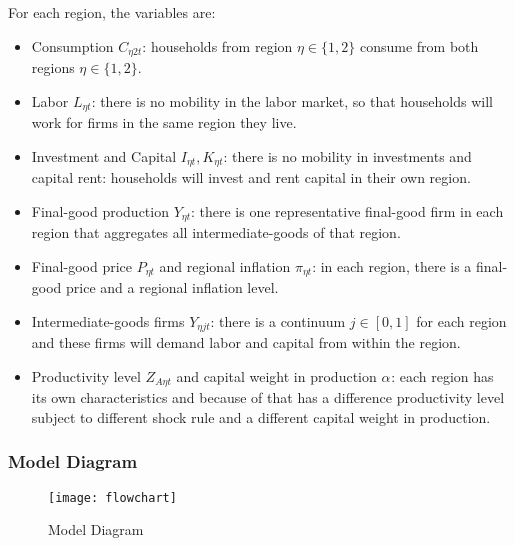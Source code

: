\documentclass[../thesis.tex]{subfiles}
\begin{document}
	For each region, the variables are:

\begin{itemize}
	\item Consumption \(C_{\eta 2 t}\): households from region $\eta \in \{1,2\}$ consume from both regions $\eta \in \{1,2\}$.
	
	\item Labor \(L_{\eta t}\): there is no mobility in the labor market, so that households will work for firms in the same region they live.
	
	\item Investment and Capital \(I_{\eta t}, K_{\eta t}\): there is no mobility in investments and capital rent: households will invest and rent capital in their own region.
	
	\item Final-good production \(Y_{\eta t}\): there is one representative final-good firm in each region that aggregates all intermediate-goods of that region.
	
	\item Final-good price \(P_{\eta t}\) and regional inflation \(\pi_{\eta t}\): in each region, there is a final-good price and a regional inflation level.
	
	\item Intermediate-goods firms \(Y_{\eta jt}\): there is a continuum $j \in [0,1]$ for each region and these firms will demand labor and capital from within the region.
	
	\item Productivity level \(Z_{A\eta t}\) and capital weight in production $\alpha_{}$: each region has its own characteristics and because of that has a difference productivity level subject to different shock rule and a different capital weight in production.
	
\end{itemize}


\subsubsection*{Model Diagram}

\begin{figure}[h!]
	\centering
	\texttt{[image: flowchart]}
	\caption{Model Diagram}
	\label{fig_v2:model-diagram}
\end{figure}
\end{document}
